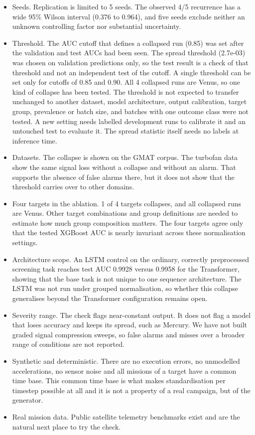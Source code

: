 \documentclass[preprint,12pt,authoryear]{elsarticle}
\begin{document}
\begin{itemize}
\item Seeds. Replication is limited to 5 seeds. The observed 4/5 recurrence has a wide 95\% Wilson interval (0.376 to 0.964), and five seeds exclude neither an unknown controlling factor nor substantial uncertainty.
\item Threshold. The AUC cutoff that defines a collapsed run (0.85) was set after the validation and test AUCs had been seen. The spread threshold (2.7e-03) was chosen on validation predictions only, so the test result is a check of that threshold and not an independent test of the cutoff. A single threshold can be set only for cutoffs of 0.85 and 0.90. All 4 collapsed runs are Venus, so one kind of collapse has been tested. The threshold is not expected to transfer unchanged to another dataset, model architecture, output calibration, target group, prevalence or batch size, and batches with one outcome class were not tested. A new setting needs labelled development runs to calibrate it and an untouched test to evaluate it. The spread statistic itself needs no labels at inference time.
\item Datasets. The collapse is shown on the GMAT corpus. The turbofan data show the same signal loss without a collapse and without an alarm. That supports the absence of false alarms there, but it does not show that the threshold carries over to other domains.
\item Four targets in the ablation. 1 of 4 targets collapses, and all collapsed runs are Venus. Other target combinations and group definitions are needed to estimate how much group composition matters. The four targets agree only that the tested XGBoost AUC is nearly invariant across these normalisation settings.
\item Architecture scope. An LSTM control on the ordinary, correctly preprocessed screening task reaches test AUC 0.9928 versus 0.9958 for the Transformer, showing that the base task is not unique to one sequence architecture. The LSTM was not run under grouped normalisation, so whether this collapse generalises beyond the Transformer configuration remains open.
\item Severity range. The check flags near-constant output. It does not flag a model that loses accuracy and keeps its spread, such as Mercury. We have not built graded signal compression sweeps, so false alarms and misses over a broader range of conditions are not reported.
\item Synthetic and deterministic. There are no execution errors, no unmodelled accelerations, no sensor noise and all missions of a target have a common time base. This common time base is what makes standardisation per timestep possible at all and it is not a property of a real campaign, but of the generator.
\item Real mission data. Public satellite telemetry benchmarks exist \citep{kotowski2024,hundman2018} and are the natural next place to try the check.
\end{itemize}
\end{document}
